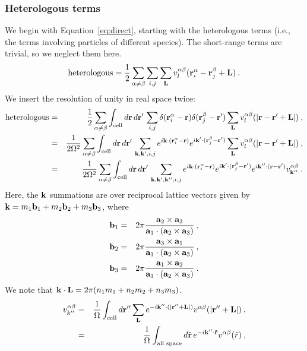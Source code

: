 \subsubsection{Heterologous terms}
We begin with Equation~\ref{eq:direct}, starting with the heterologous terms (i.e., the terms involving particles of different species).  The
short-range terms are trivial, so we neglect them here.
\begin{equation}
\text{heterologous} = \frac{1}{2} \sum_{\alpha \neq \beta} \sum_{i,j} \sum_{\mathbf{L}}
v^{\alpha\beta}_l(\mathbf{r}_i^\alpha - \mathbf{r}_j^\beta + \mathbf{L})\:.
\end{equation}
We insert the resolution of unity in real space twice:
\begin{eqnarray}
\text{heterologous} & = & \frac{1}{2}\sum_{\alpha \neq \beta} \int_\text{cell} d\mathbf{r} \, d\mathbf{r}' \, \sum_{i,j}
\delta(\mathbf{r}_i^\alpha - \mathbf{r}) \delta(\mathbf{r}_j^\beta-\mathbf{r}') \sum_{\mathbf{L}}
v^{\alpha\beta}_l(|\mathbf{r} - \mathbf{r}' + \mathbf{L}|)\:, \\
& = & \frac{1}{2\Omega^2}\sum_{\alpha \neq \beta} \int_\text{cell} d\mathbf{r} \, d\mathbf{r}' \, \sum_{\mathbf{k}, \mathbf{k}', i, j} e^{i\mathbf{k}\cdot(\mathbf{r}_i^\alpha
  - \mathbf{r})} e^{i\mathbf{k}'\cdot(\mathbf{r}_j^\beta - \mathbf{r}')} \sum_{\mathbf{L}}
v^{\alpha\beta}_l(|\mathbf{r} - \mathbf{r}' + \mathbf{L}|) \nonumber\:, \\
& = & \frac{1}{2\Omega^2} \sum_{\alpha \neq \beta} \int_\text{cell} d\mathbf{r} \, d\mathbf{r}'\,
\sum_{\mathbf{k}, \mathbf{k}', \mathbf{k}'', i, j} e^{i\mathbf{k}\cdot(\mathbf{r}_i^\alpha - \mathbf{r})}
e^{i\mathbf{k}'\cdot(\mathbf{r}_j^\beta-\mathbf{r}')} e^{i\mathbf{k}''\cdot(\mathbf{r} -\mathbf{r}')}
v^{\alpha\beta}_{\mathbf{k}''}\nonumber\:.
\end{eqnarray}
Here, the $\mathbf{k}$ summations are over reciprocal lattice vectors given
by $\mathbf{k} = m_1 \mathbf{b}_1 + m_2\mathbf{b}_2 + m_3\mathbf{b}_3$, where
\begin{eqnarray}
\mathbf{b}_1 & = & 2\pi \frac{\mathbf{a}_2 \times \mathbf{a}_3}{\mathbf{a}_1 \cdot (\mathbf{a}_2 \times
  \mathbf{a}_3)} \nonumber\:, \\
\mathbf{b}_2 & = & 2\pi \frac{\mathbf{a}_3 \times \mathbf{a}_1}{\mathbf{a}_1 \cdot (\mathbf{a}_2 \times
  \mathbf{a}_3)}\:, \\
\mathbf{b}_3 & = & 2\pi \frac{\mathbf{a}_1 \times \mathbf{a}_2}{\mathbf{a}_1 \cdot (\mathbf{a}_2 \times
  \mathbf{a}_3)} \nonumber\:.
\end{eqnarray}
We note that $\mathbf{k} \cdot \mathbf{L} = 2\pi(n_1 m_1 + n_2 m_2 + n_3 m_3)$. 
\begin{eqnarray}
v_{k''}^{\alpha \beta} & = & 
\frac{1}{\Omega} \int_{\text{cell}} d\mathbf{r}'' \sum_{\mathbf{L}}
e^{-i\mathbf{k}''\cdot(|\mathbf{r}''+\mathbf{L}|)} v^{\alpha\beta}(|\mathbf{r}''+\mathbf{L}|)\:, \\
& = & \frac{1}{\Omega} \int_\text{all space} d\tilde{\mathbf{r}} \, 
    e^{-i\mathbf{k}'' \cdot \tilde{\mathbf{r}}} v^{\alpha\beta}(\tilde{r})\:, \label{eq:vk}
\end{eqnarray}
